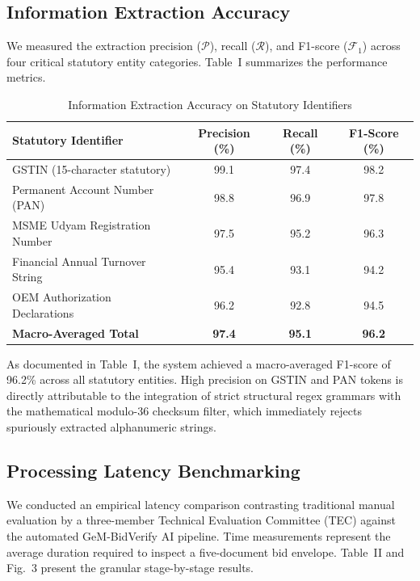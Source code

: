 \documentclass[conference]{IEEEtran}
\begin{document}
\subsection{Information Extraction Accuracy}
We measured the extraction precision ($\mathcal{P}$), recall ($\mathcal{R}$), and F1-score ($\mathcal{F}_1$) across four critical statutory entity categories. Table~I summarizes the performance metrics.

\begin{table}[!ht]
\centering
\caption{Information Extraction Accuracy on Statutory Identifiers}
\label{tab:extraction}
\begin{tabularx}{\columnwidth}{Xccc}
\toprule
\textbf{Statutory Identifier} & \textbf{Precision (\%)} & \textbf{Recall (\%)} & \textbf{F1-Score (\%)} \\
\midrule
GSTIN (15-character statutory) & 99.1 & 97.4 & 98.2 \\
Permanent Account Number (PAN) & 98.8 & 96.9 & 97.8 \\
MSME Udyam Registration Number & 97.5 & 95.2 & 96.3 \\
Financial Annual Turnover String & 95.4 & 93.1 & 94.2 \\
OEM Authorization Declarations & 96.2 & 92.8 & 94.5 \\
\midrule
\textbf{Macro-Averaged Total} & \textbf{97.4} & \textbf{95.1} & \textbf{96.2} \\
\bottomrule
\end{tabularx}
\end{table}

As documented in Table~I, the system achieved a macro-averaged F1-score of 96.2\% across all statutory entities. High precision on GSTIN and PAN tokens is directly attributable to the integration of strict structural regex grammars with the mathematical modulo-36 checksum filter, which immediately rejects spuriously extracted alphanumeric strings.

\subsection{Processing Latency Benchmarking}
We conducted an empirical latency comparison contrasting traditional manual evaluation by a three-member Technical Evaluation Committee (TEC) against the automated GeM-BidVerify AI pipeline. Time measurements represent the average duration required to inspect a five-document bid envelope. Table~II and Fig.~3 present the granular stage-by-stage results.
\end{document}
